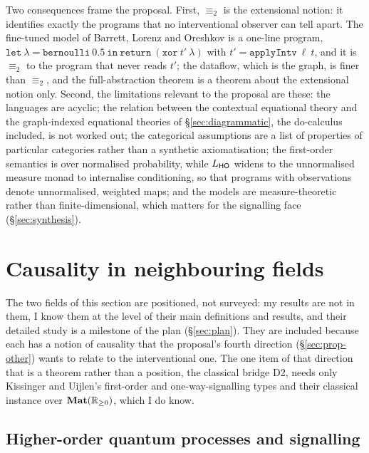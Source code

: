 Two consequences frame the proposal. First, $\equiv_2$ is the extensional notion: it identifies exactly the programs that no interventional observer can tell apart. The fine-tuned model of Barrett, Lorenz and Oreshkov is a one-line program, $\mathtt{let}\ \lambda = \mathtt{bernoulli}\ 0.5\ \mathtt{in}\ \mathtt{return}\ (\mathtt{xor}\ t'\ \lambda)$ with $t' = \mathtt{applyIntv}\ \ell\ t$, and it is $\equiv_2$ to the program that never reads $t'$; the dataflow, which is the graph, is finer than $\equiv_2$, and the full-abstraction theorem is a theorem about the extensional notion only. Second, the limitations relevant to the proposal are these: the languages are acyclic; the relation between the contextual equational theory and the graph-indexed equational theories of \S\ref{sec:diagrammatic}, the do-calculus included, is not worked out; the categorical assumptions are a list of properties of particular categories rather than a synthetic axiomatisation; the first-order semantics is over normalised probability, while $L_{\mathsf{HO}}$ widens to the unnormalised measure monad to internalise conditioning, so that programs with observations denote unnormalised, weighted maps; and the models are measure-theoretic rather than finite-dimensional, which matters for the signalling face (\S\ref{sec:synthesis}).

\section{Causality in neighbouring fields}\label{sec:order}

The two fields of this section are positioned, not surveyed: my results are not in them, I know them at the level of their main definitions and results, and their detailed study is a milestone of the plan (\S\ref{sec:plan}). They are included because each has a notion of causality that the proposal's fourth direction (\S\ref{sec:prop-other}) wants to relate to the interventional one. The one item of that direction that is a theorem rather than a position, the classical bridge D2, needs only Kissinger and Uijlen's first-order and one-way-signalling types and their classical instance over $\mathbf{Mat}(\mathbb{R}_{\geq 0})$, which I do know.

\subsection{Higher-order quantum processes and signalling}\label{sec:hoqc}


